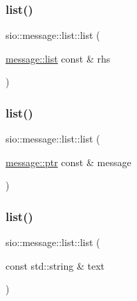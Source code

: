 \subsubsection{\texorpdfstring{list()}{list()}\hspace{0.1cm}{\footnotesize\ttfamily [5/10]}}
{\footnotesize\ttfamily sio\+::message\+::list\+::list (\begin{DoxyParamCaption}\item[{\hyperlink{classsio_1_1message_1_1list}{message\+::list} const \&}]{rhs }\end{DoxyParamCaption})\hspace{0.3cm}{\ttfamily [inline]}}

\mbox{\label{classsio_1_1message_1_1list_ac52420cb9519a2fd0c22471f6dd487b6}} 
\subsubsection{\texorpdfstring{list()}{list()}\hspace{0.1cm}{\footnotesize\ttfamily [6/10]}}
{\footnotesize\ttfamily sio\+::message\+::list\+::list (\begin{DoxyParamCaption}\item[{\hyperlink{classsio_1_1message_a6340b6fef57e4516eb17928b1885a615}{message\+::ptr} const \&}]{message }\end{DoxyParamCaption})\hspace{0.3cm}{\ttfamily [inline]}}

\mbox{\label{classsio_1_1message_1_1list_a22d71cb93f3b80b85933ad5a0558b3a4}} 
\subsubsection{\texorpdfstring{list()}{list()}\hspace{0.1cm}{\footnotesize\ttfamily [7/10]}}
{\footnotesize\ttfamily sio\+::message\+::list\+::list (\begin{DoxyParamCaption}\item[{const std\+::string \&}]{text }\end{DoxyParamCaption})\hspace{0.3cm}{\ttfamily [inline]}}

